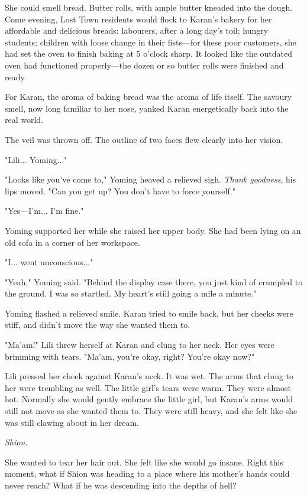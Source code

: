 She could smell bread. Butter rolls, with ample butter kneaded into the
dough. Come evening, Lost Town residents would flock to Karan's bakery
for her affordable and delicious breads: labourers, after a long day's
toil; hungry students; children with loose change in their fists---for
these poor customers, she had set the oven to finish baking at 5 o'clock
sharp. It looked like the outdated oven had functioned properly---the
dozen or so butter rolls were finished and ready.

For Karan, the aroma of baking bread was the aroma of life itself. The
savoury smell, now long familiar to her nose, yanked Karan energetically
back into the real world.

The veil was thrown off. The outline of two faces flew clearly into her
vision.

"Lili... Yoming..."

"Looks like you've come to," Yoming heaved a relieved sigh. \emph{Thank
goodness}, his lips moved. "Can you get up? You don't have to force
yourself."

"Yes---I'm... I'm fine."

Yoming supported her while she raised her upper body. She had been lying
on an old sofa in a corner of her workspace.

"I... went unconscious..."

"Yeah," Yoming said. "Behind the display case there, you just kind of
crumpled to the ground. I was so startled. My heart's still going a mile
a minute."

Yoming flashed a relieved smile. Karan tried to smile back, but her
cheeks were stiff, and didn't move the way she wanted them to.

"Ma'am!" Lili threw herself at Karan and clung to her neck. Her eyes
were brimming with tears. "Ma'am, you're okay, right? You're okay now?"

Lili pressed her cheek against Karan's neck. It was wet. The arms that
clung to her were trembling as well. The little girl's tears were warm.
They were almost hot. Normally she would gently embrace the little girl,
but Karan's arms would still not move as she wanted them to. They were
still heavy, and she felt like she was still clawing about in her dream.

\emph{Shion.}

She wanted to tear her hair out. She felt like she would go insane.
Right this moment, what if Shion was heading to a place where his
mother's hands could never reach? What if he was descending into the
depths of hell?

